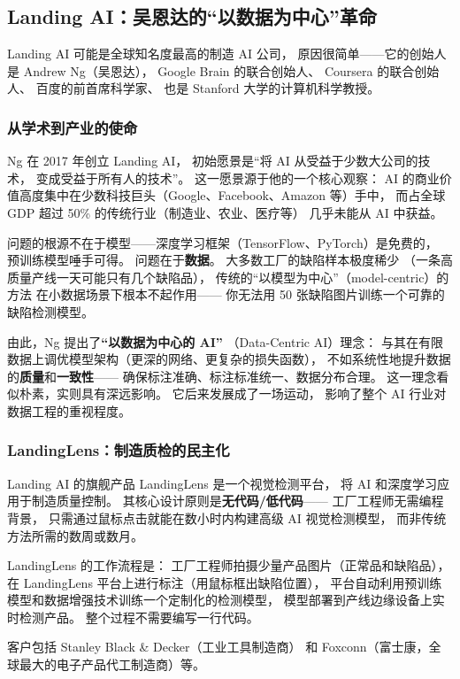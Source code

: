 \subsection{Landing AI：吴恩达的``以数据为中心''革命}

Landing AI 可能是全球知名度最高的制造 AI 公司，
原因很简单——它的创始人是 Andrew Ng（吴恩达），
Google Brain 的联合创始人、
Coursera 的联合创始人、
百度的前首席科学家、
也是 Stanford 大学的计算机科学教授。

\subsubsection{从学术到产业的使命}
Ng 在 2017 年创立 Landing AI，
初始愿景是``将 AI 从受益于少数大公司的技术，
变成受益于所有人的技术''。
这一愿景源于他的一个核心观察：
AI 的商业价值高度集中在少数科技巨头（Google、Facebook、Amazon 等）手中，
而占全球 GDP 超过 50\% 的传统行业（制造业、农业、医疗等）
几乎未能从 AI 中获益。

问题的根源不在于模型——深度学习框架（TensorFlow、PyTorch）是免费的，
预训练模型唾手可得。
问题在于\textbf{数据}。
大多数工厂的缺陷样本极度稀少
（一条高质量产线一天可能只有几个缺陷品），
传统的``以模型为中心''（model-centric）的方法
在小数据场景下根本不起作用——
你无法用 50 张缺陷图片训练一个可靠的缺陷检测模型。

由此，Ng 提出了\textbf{``以数据为中心的 AI''}
（Data-Centric AI）理念：
与其在有限数据上调优模型架构（更深的网络、更复杂的损失函数），
不如系统性地提升数据的\textbf{质量}和\textbf{一致性}——
确保标注准确、标注标准统一、数据分布合理。
这一理念看似朴素，实则具有深远影响。
它后来发展成了一场运动，
影响了整个 AI 行业对数据工程的重视程度。

\subsubsection{LandingLens：制造质检的民主化}
Landing AI 的旗舰产品 LandingLens 是一个视觉检测平台，
将 AI 和深度学习应用于制造质量控制。
其核心设计原则是\textbf{无代码/低代码}——
工厂工程师无需编程背景，
只需通过鼠标点击就能在数小时内构建高级 AI 视觉检测模型，
而非传统方法所需的数周或数月。

LandingLens 的工作流程是：
工厂工程师拍摄少量产品图片（正常品和缺陷品），
在 LandingLens 平台上进行标注（用鼠标框出缺陷位置），
平台自动利用预训练模型和数据增强技术训练一个定制化的检测模型，
模型部署到产线边缘设备上实时检测产品。
整个过程不需要编写一行代码。

客户包括 Stanley Black \& Decker（工业工具制造商）
和 Foxconn（富士康，全球最大的电子产品代工制造商）等。

